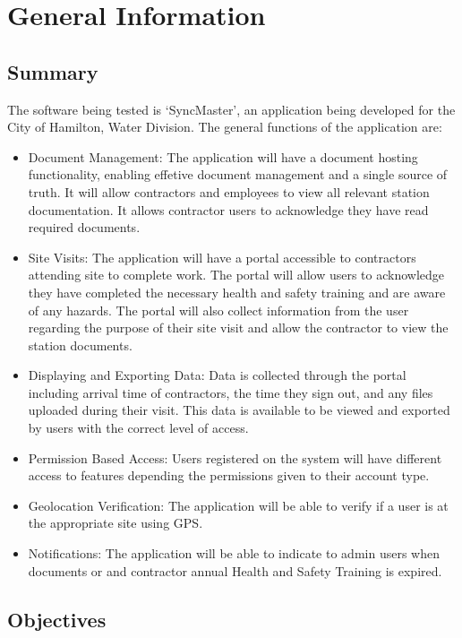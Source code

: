 \documentclass[12pt, titlepage]{article}
\begin{document}
\section{General Information}

\subsection{Summary}

The software being tested is `SyncMaster', an application being
developed for the City of Hamilton, Water Division. The general
functions of the application are:

\begin{itemize}
  \item Document Management: The application will have a document
    hosting functionality, enabling effetive document management and a single source of truth.
    It will allow contractors and employees to view all relevant station documentation.
    It allows contractor users to acknowledge they have read required documents.
  \item Site Visits: The application will have a portal
    accessible to contractors attending site to complete work. The portal will allow users to acknowledge they have
    completed the necessary health and safety training and are aware
    of any hazards. The portal will also collect
    information from the user regarding the purpose of their site visit and allow the contractor to view
    the station documents.
  \item Displaying and Exporting Data: Data is collected through the
    portal including arrival time of contractors, the time they sign out,
    and any files uploaded during their visit. This data is
    available to be viewed and exported by users with the correct
    level of access.
  \item Permission Based Access: Users registered on the system will
    have different access to features depending the permissions given
    to their account type.
  \item Geolocation Verification: The application will be able to
    verify if a user is at the appropriate site using GPS.
  \item Notifications: The application will be able to indicate to admin users
    when documents or and contractor annual Health and Safety Training is expired.
\end{itemize}

\subsection{Objectives}
\end{document}
